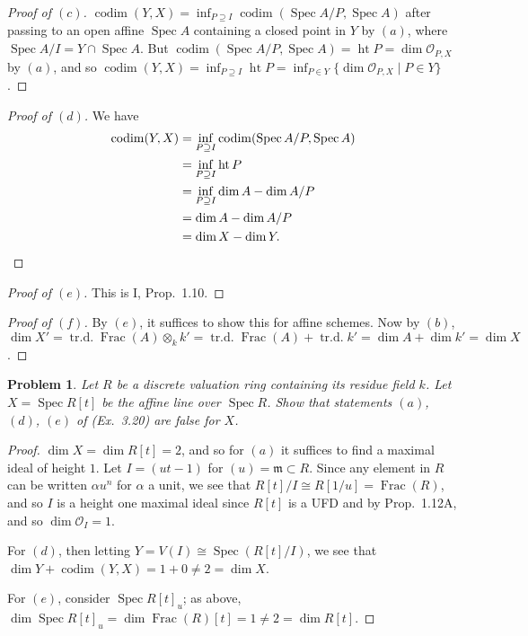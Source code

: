 \documentclass[12pt,letterpaper]{article}
\newtheorem{problem}{Problem}[section]
\theoremstyle{definition}
\theoremstyle{remark}
\numberwithin{equation}{section}
\numberwithin{figure}{problem}
\DeclareMathOperator{\Spec}{Spec}
\DeclareMathOperator{\Ht}{ht}
\DeclareMathOperator{\Frac}{Frac}
\DeclareMathOperator{\trd}{tr.d.}
\DeclareMathOperator{\codim}{codim}
\newcommand{\OO}{\mathcal{O}}
\begin{document}
\begin{proof}[Proof of $(c)$]
  $\codim(Y,X) = \inf_{P \supseteq I} \codim(\Spec A/P,\Spec A)$ after passing to an open affine $\Spec A$ containing a closed point in $Y$ by $(a)$, where $\Spec A/I = Y \cap \Spec A$. But $\codim(\Spec A/P,\Spec A) = \Ht P = \dim \OO_{P,X}$ by $(a)$, and so $\codim(Y,X) = \inf_{P \supseteq I} \Ht P = \inf_{P \in Y}\{\dim\OO_{P,X} \mid P \in Y\}$.
\end{proof}
\begin{proof}[Proof of $(d)$]
  We have
  \begin{align*}
    \codim(Y,X) &= \inf_{P \supseteq I} \codim(\Spec A/P,\Spec A)\\
    &= \inf_{P \supseteq I} \Ht P\\
    &= \inf_{P \supseteq I} \dim A - \dim A/P\\
    &= \dim A - \dim A/P\\
    &= \dim X - \dim Y.\qedhere
  \end{align*}
\end{proof}
\begin{proof}[Proof of $(e)$]
  This is I, Prop.~1.10.
\end{proof}
\begin{proof}[Proof of $(f)$]
  By $(e)$, it suffices to show this for affine schemes. Now by $(b)$, $\dim X' = \trd \Frac(A) \otimes_k k' = \trd \Frac(A) + \trd k' = \dim A + \dim k' = \dim X$.
\end{proof}

\begin{problem}
  Let $R$ be a discrete valuation ring containing its residue field $k$. Let $X = \Spec R[t]$ be the affine line over $\Spec R$. Show that statements $(a)$, $(d)$, $(e)$ of \emph{(Ex.~3.20)} are false for $X$.
\end{problem}
\begin{proof}
  $\dim X = \dim R[t] = 2$, and so for $(a)$ it suffices to find a maximal ideal of height $1$. Let $I = (ut-1)$ for $(u) = \mathfrak{m} \subset R$. Since any element in $R$ can be written $\alpha u^n$ for $\alpha$ a unit, we see that $R[t]/I \cong R[1/u] = \Frac(R)$, and so $I$ is a height one maximal ideal since $R[t]$ is a UFD and by Prop.~1.12A, and so $\dim \OO_I =1$.
  \par For $(d)$, then letting $Y = V(I) \cong \Spec(R[t]/I)$, we see that $\dim Y + \codim(Y,X) = 1 + 0 \ne 2 = \dim X$.
  \par For $(e)$, consider $\Spec R[t]_u$; as above, $\dim \Spec R[t]_u = \dim \Frac(R)[t] = 1 \ne 2 = \dim R[t]$.
\end{proof}
\end{document}
